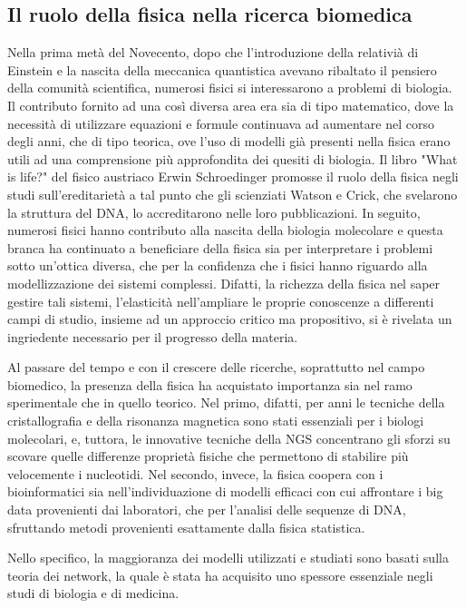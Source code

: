 \subsection{Il ruolo della fisica nella ricerca biomedica}
Nella prima metà del Novecento, dopo che l'introduzione della relativià di Einstein e la nascita della meccanica quantistica avevano ribaltato il pensiero della comunità scientifica, numerosi fisici si interessarono a problemi di biologia.
Il contributo fornito ad una così diversa area era sia di tipo matematico, dove la necessità di utilizzare equazioni e formule continuava ad aumentare nel corso degli anni, che di tipo teorica, ove l'uso di modelli già presenti nella fisica erano utili ad una comprensione più approfondita dei quesiti di biologia.
Il libro "What is life?" del fisico austriaco Erwin Schroedinger promosse il ruolo della fisica negli studi sull'ereditarietà a tal punto che gli scienziati Watson e Crick, che svelarono la struttura del DNA, lo accreditarono nelle loro pubblicazioni.
In seguito, numerosi fisici hanno contributo alla nascita della biologia molecolare e questa branca ha continuato a beneficiare della fisica sia per interpretare i problemi sotto un'ottica diversa, che per la confidenza che i fisici hanno riguardo alla modellizzazione dei sistemi complessi.
Difatti, la richezza della fisica nel saper gestire tali sistemi, l'elasticità nell'ampliare le proprie conoscenze a differenti campi di studio, insieme ad un approccio critico ma propositivo, si è rivelata un ingriedente necessario per il progresso della materia.

Al passare del tempo e con il crescere delle ricerche, soprattutto nel campo biomedico, la presenza della fisica ha acquistato importanza sia nel ramo sperimentale che in quello teorico.
Nel primo, difatti, per anni le tecniche della cristallografia e della risonanza magnetica sono stati essenziali per i biologi molecolari, e, tuttora, le innovative tecniche della NGS concentrano gli sforzi su scovare quelle differenze proprietà fisiche che permettono di stabilire più velocemente i nucleotidi.
Nel secondo, invece, la fisica coopera con i bioinformatici sia nell'individuazione di modelli efficaci con cui affrontare i big data provenienti dai laboratori, che per l'analisi delle sequenze di DNA, sfruttando metodi provenienti esattamente dalla fisica statistica.

Nello specifico, la maggioranza dei modelli utilizzati e studiati sono basati sulla teoria dei network, la quale è stata ha acquisito uno spessore essenziale negli studi di biologia e di medicina.

